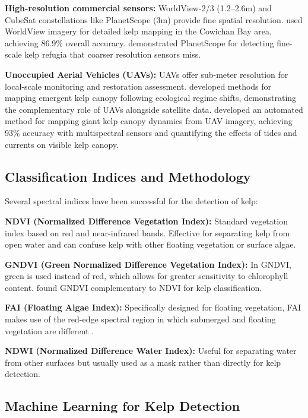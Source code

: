 \documentclass[12pt,oneside]{book}
\begin{document}
\textbf{High-resolution commercial sensors:} WorldView-2/3 (1.2--2.6m) and CubeSat constellations like PlanetScope (3m) provide fine spatial resolution. \citet{Schroeder2020} used WorldView imagery for detailed kelp mapping in the Cowichan Bay area, achieving 86.9\% overall accuracy. \citet{CavanaughKC2023} demonstrated PlanetScope for detecting fine-scale kelp refugia that coarser resolution sensors miss.

\textbf{Unoccupied Aerial Vehicles (UAVs):} UAVs offer sub-meter resolution for local-scale monitoring and restoration assessment. \citet{Saccomanno2023} developed methods for mapping emergent kelp canopy following ecological regime shifts, demonstrating the complementary role of UAVs alongside satellite data. \citet{CavanaughUAV2021} developed an automated method for mapping giant kelp canopy dynamics from UAV imagery, achieving 93\% accuracy with multispectral sensors and quantifying the effects of tides and currents on visible kelp canopy.

\subsection{Classification Indices and Methodology}
\label{subsec:classification-methods}

Several spectral indices have been successful for the detection of kelp:

\textbf{NDVI (Normalized Difference Vegetation Index):} Standard vegetation index based on red and near-infrared bands. Effective for separating kelp from open water and can confuse kelp with other floating vegetation or surface algae.

\textbf{GNDVI (Green Normalized Difference Vegetation Index):} In GNDVI, green is used instead of red, which allows for greater sensitivity to chlorophyll content. \citet{Schroeder2020} found GNDVI complementary to NDVI for kelp classification.

\textbf{FAI (Floating Algae Index):} Specifically designed for floating vegetation, FAI makes use of the red-edge spectral region in which submerged and floating vegetation are different \citep{Gendall2023}.

\textbf{NDWI (Normalized Difference Water Index):} Useful for separating water from other surfaces but usually used as a mask rather than directly for kelp detection.

\subsection{Machine Learning for Kelp Detection}
\label{subsec:ml-kelp}
\end{document}
